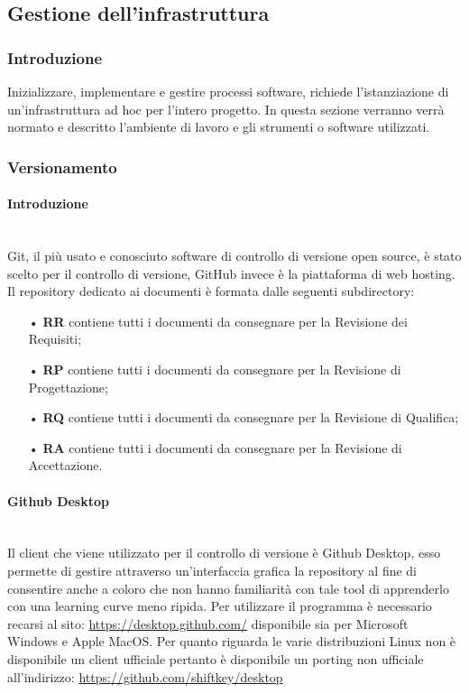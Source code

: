 \subsection{Gestione dell'infrastruttura}




\subsubsection{Introduzione}
Inizializzare, implementare e gestire processi software, richiede l’istanziazione di un’infrastruttura ad hoc per l'intero progetto. In questa sezione verranno verrà normato e descritto l’ambiente di lavoro e gli strumenti o software utilizzati.

\subsubsection{Versionamento}

\paragraph{Introduzione}\mbox{}\\
Git, il più usato e conosciuto {software di controllo di versione} {open source}, è stato scelto per il controllo di versione, GitHub invece è la piattaforma di web hosting. 
\newline
Il repository dedicato ai documenti è formata dalle seguenti subdirectory:
\begin{itemize}
\item[•] \textbf{RR} contiene tutti i documenti da consegnare per la Revisione dei Requisiti;
\item[•] \textbf{RP} contiene tutti i documenti da consegnare per la Revisione di Progettazione;
\item[•] \textbf{RQ} contiene tutti i documenti da consegnare per la Revisione di Qualifica;
\item[•] \textbf{RA} contiene tutti i documenti da consegnare per la Revisione di Accettazione.
\end{itemize}

\paragraph{Github Desktop}\mbox{}\\
Il {client} che viene utilizzato per il controllo di versione è Github Desktop, esso permette di gestire attraverso un'interfaccia grafica la {repository} al fine di consentire anche a coloro che non hanno familiarità con tale tool di apprenderlo con una {learning curve} meno ripida. Per utilizzare il programma è necessario recarsi al sito: \url{https://desktop.github.com/} disponibile sia per {Microsoft Windows} e {Apple MacOS}. Per quanto riguarda le varie {distribuzioni Linux} non è disponibile un client ufficiale pertanto è disponibile un {porting} non ufficiale all'indirizzo: \url{https://github.com/shiftkey/desktop}
